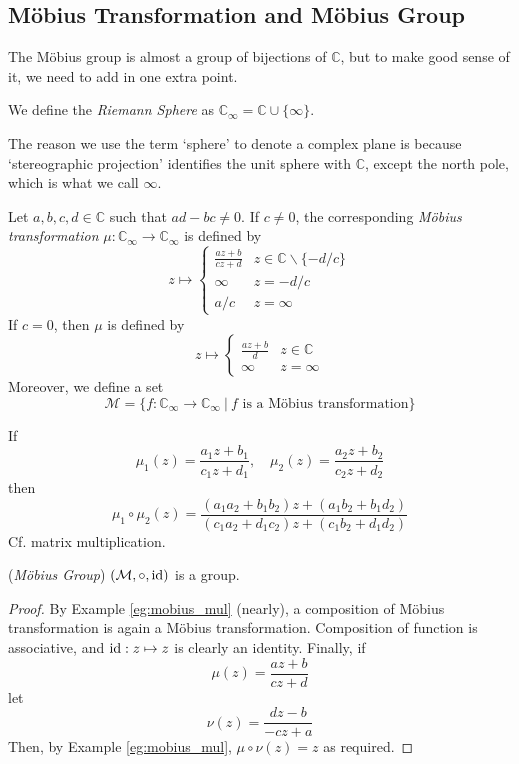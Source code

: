 \documentclass[10pt, a4paper, twoside]{report}
\begin{document}
\subsection{Möbius Transformation and Möbius Group}
The Möbius group is almost a group of bijections of \(\mathbb{C}\), but to make good sense of it, we need to add in one extra point.
\begin{definition}
    We define the \emph{Riemann Sphere} as \(\mathbb{C}_\infty=\mathbb{C}\cup\{\infty\}\).
\end{definition}
The reason we use the term `sphere' to denote a complex plane is because `stereographic projection' identifies the unit sphere with \(\mathbb{C}\), except the north pole, which is what we call \(\infty\).
\begin{definition}
    Let \(a,b,c,d\in\mathbb{C}\) such that \(ad-bc\neq 0\). If \(c\neq 0\), the corresponding \emph{Möbius transformation} \(\mu:\mathbb{C}_\infty\to\mathbb{C}_\infty\) is defined by 
    \[z\mapsto\begin{cases}
        \frac{az+b}{cz+d} & z\in\mathbb{C}\backslash\{-d/c\} \\
        \infty & z=-d/c \\
        a/c & z=\infty 
    \end{cases}\]
    If \(c=0\), then \(\mu\) is defined by 
    \[z\mapsto\begin{cases}
        \frac{az+b}{d} & z\in\mathbb{C} \\
        \infty & z=\infty
    \end{cases}\]
    Moreover, we define a set 
    \[\mathcal{M}=\{f:\mathbb{C}_\infty\to\mathbb{C}_\infty\:|\:f\text{  is a Möbius transformation}\}\]
\end{definition}
\begin{example}
    If 
    \[\mu_1(z)=\frac{a_1z+b_1}{c_1z+d_1},\quad\mu_2(z)=\frac{a_2z+b_2}{c_2z+d_2}\]
    then 
    \[\mu_1\circ\mu_2(z)=\frac{(a_1a_2+b_1b_2)z+(a_1b_2+b_1d_2)}{(c_1a_2+d_1c_2)z+(c_1b_2+d_1d_2)}\]
    Cf. matrix multiplication.
    \label{eg:mobius_mul}
\end{example}
\begin{theorem}
    (\emph{Möbius Group}) \((\mathcal{M},\circ,\operatorname{id})\) is a group.
\end{theorem}
\begin{proof}
    By Example \ref{eg:mobius_mul} (nearly), a composition of Möbius transformation is again a Möbius transformation. Composition of function is associative, and \(\operatorname{id}:z\mapsto z\) is clearly an identity. Finally, if 
    \[\mu(z)=\frac{az+b}{cz+d}\]
    let 
    \[\nu(z)=\frac{dz-b}{-cz+a}\]
    Then, by Example \ref{eg:mobius_mul}, \(\mu\circ\nu(z)=z\) as required.
\end{proof}
\end{document}
